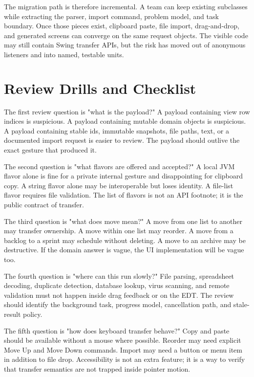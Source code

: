 The migration path is therefore incremental. A team can keep existing  subclasses while extracting the parser, import command, problem model, and task boundary. Once those pieces exist, clipboard paste, file import, drag-and-drop, and generated screens can converge on the same request objects. The visible code may still contain Swing transfer APIs, but the risk has moved out of anonymous listeners and into named, testable units.

\section{Review Drills and Checklist}

The first review question is "what is the payload?" A payload containing view row indices is suspicious. A payload containing mutable domain objects is suspicious. A payload containing stable ids, immutable snapshots, file paths, text, or a documented import request is easier to review. The payload should outlive the exact gesture that produced it.

The second question is "what flavors are offered and accepted?" A local JVM flavor alone is fine for a private internal gesture and disappointing for clipboard copy. A string flavor alone may be interoperable but loses identity. A file-list flavor requires file validation. The list of flavors is not an API footnote; it is the public contract of transfer.

The third question is "what does move mean?" A move from one list to another may transfer ownership. A move within one list may reorder. A move from a backlog to a sprint may schedule without deleting. A move to an archive may be destructive. If the domain answer is vague, the UI implementation will be vague too.

The fourth question is "where can this run slowly?" File parsing, spreadsheet decoding, duplicate detection, database lookup, virus scanning, and remote validation must not happen inside drag feedback or on the EDT. The review should identify the background task, progress model, cancellation path, and stale-result policy.

The fifth question is "how does keyboard transfer behave?" Copy and paste should be available without a mouse where possible. Reorder may need explicit Move Up and Move Down commands. Import may need a button or menu item in addition to file drop. Accessibility is not an extra feature; it is a way to verify that transfer semantics are not trapped inside pointer motion.

